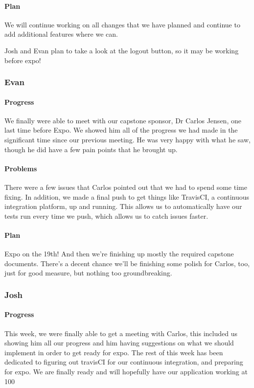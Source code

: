\documentclass[onecolumn, draftclsnofoot,10pt, compsoc]{IEEEtran}
\begin{document}
	\paragraph{Plan}
	We will continue working on all changes that we have planned and continue to add additional features where we can.
	
	Josh and Evan plan to take a look at the logout button, so it may be working before expo!
	
	
	\subsubsection{Evan}
	
	\paragraph{Progress}
	
	We finally were able to meet with our capstone sponsor, Dr Carlos Jensen, one last time before Expo. We showed him all of the progress we had made in the significant time since our previous meeting. He was very happy with what he saw, though he did have a few pain points that he brought up.
	
	\paragraph{Problems}
	
	There were a few issues that Carlos pointed out that we had to spend some time fixing. In addition, we made a final push to get things like TravisCI, a continuous integration platform, up and running. This allows us to automatically have our tests run every time we push, which allows us to catch issues faster.
	
	\paragraph{Plan}
	
	Expo on the 19th! And then we're finishing up mostly the required capstone documents. There's a decent chance we'll be finishing some polish for Carlos, too, just for good measure, but nothing too groundbreaking.
	
	\subsubsection{Josh}
	
	\paragraph{Progress}
	This week, we were finally able to get a meeting with Carlos, this included us showing him all our progress and him having suggestions on what we should implement in order to get ready for expo. The rest of this week has been dedicated to figuring out travisCI for our continuous integration, and preparing for expo. We are finally ready and will hopefully have our application working at 100%
	
\end{document}
